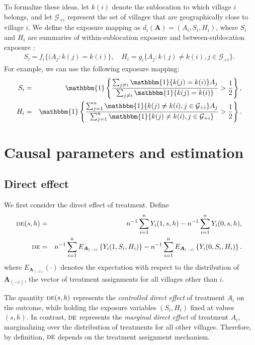 \documentclass{article}
\newcommand{\bA}{\boldsymbol{A}}
\newcommand{\indicator}{\mathbbm{1}}
\newcommand{\cG}{\mathcal{G}}
\newcommand{\sumi}{\sum_{i=1}^n}
\newcommand{\sumj}{\sum_{j=1}^n}
\newcommand{\de}{\textsc{de}}
\begin{document}
To formalize these ideas, let $k(i)$ denote the sublocation to which village $i$ belongs, and let $\cG_{+i}$ represent the set of villages that are geographically close to village $i$. We define the exposure mapping as $d_i(\bA) = (A_{i}, S_{i}, H_{i})$, where $S_i$ and $H_i$ are summaries of within-sublocation exposure and between-sublocation exposure \citep{aronow2017estimating}:
\begin{eqnarray*}
    S_{i} = f_i\{(A_{j}: k(j)=k(i)\}, \quad 
    H_{i} = g_i\{A_j: k(j)\neq k(i), j\in\cG_{+i}\}. 
\end{eqnarray*}
For example, we can use the following exposure mapping:  
\begin{eqnarray*}
    S_{i} &=& \indicator\left\{\frac{\sum_{j\neq i}\indicator\{k(j)=k(i)\} A_{j}}{\sum_{j\neq i}\indicator\{k(j)=k(i)\}} > \frac{1}{2}\right\},  \\
    H_{i} &=& \indicator \left\{\frac{\sumj \indicator\{k(j)\neq k(i), j\in\cG_{+i}\}A_{j}}{\sumj \indicator\{k(j)\neq k(i), j\in\cG_{+i}\}} > \frac{1}{2}\right\}.
\end{eqnarray*}


\section{Causal parameters and estimation}
\label{sec::parameters}
\subsection{Direct effect}
We first consider the direct effect of treatment. Define
\begin{eqnarray*}
    \de(s,h) &=& n^{-1}\sumi Y_{i}(1,s,h) - n^{-1}\sumi Y_{i}(0,s,h), \\
    \de &=& n^{-1}\sumi E_{\bA_{(-i)}}\left\{Y_{i}(1,S_{i},H_{i})\right\} - n^{-1}\sumi E_{\bA_{(-i)}}\left\{Y_{i}(0,S_{i},H_{i})\right\}.
\end{eqnarray*}
where $E_{\bA_{(-i)}}(\cdot)$ denotes the expectation with respect to the distribution of $\bA_{(-i)}$, the vector of treatment assignments for all villages other than $i$. 

The quantity $\de(s,h)$ represents the \textit{controlled direct effect} of treatment $A_{i}$ on the outcome, while holding the exposure variables $(S_{i},H_{i})$ fixed at values $(s,h)$. In contrast, $\de$ represents the \textit{marginal direct effect} of treatment $A_{i}$, marginalizing over the distribution of treatments for all other villages. Therefore, by definition, $\de$ depends on the treatment assignment mechanism.
\end{document}
